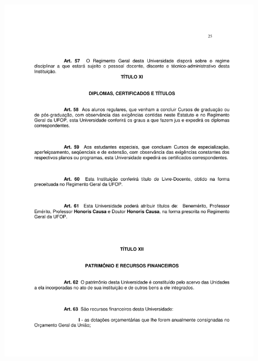 \begin{figure}[p]
	\centering 
	\includegraphics[scale=0.7]{capitulos/resolucoes/cuni414/cuni414-25.pdf}
\end{figure} \pagebreak

